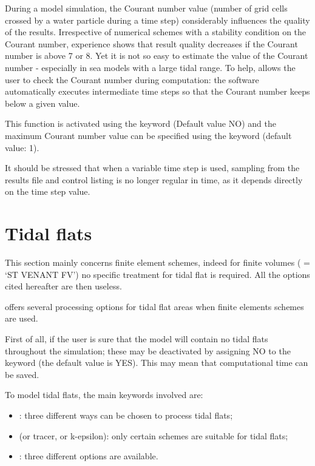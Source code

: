  During a model simulation, the Courant number value (number of grid cells crossed by a water particle during a time step) considerably influences the quality of the results. Irrespective of numerical schemes with a stability condition on the Courant number, experience shows that result quality decreases if the Courant number is above 7 or 8. Yet it is not so easy to estimate the value of the Courant number - especially in sea models with a large tidal range. To help,  allows the user to check the Courant number during computation: the software automatically executes intermediate time steps so that the Courant number keeps below a given value.

 This function is activated using the keyword  (Default value NO) and the maximum Courant number value can be specified using the keyword  (default value: 1).

 It should be stressed that when a variable time step is used, sampling from the results file and control listing is no longer regular in time, as it depends directly on the time step value.


\section{ Tidal flats}
This section mainly concerns finite element schemes, indeed for finite volumes ( = `ST VENANT FV') no specific treatment for tidal flat is required.
All the options cited hereafter are then useless.

 offers several processing options for tidal flat areas when finite elements schemes are used.

 First of all, if the user is sure that the model will contain no tidal flats throughout the simulation; these may be deactivated by assigning NO to the keyword  (the default value is YES). This may mean that computational time can be saved.

To model tidal flats, the main keywords involved are:
\begin{itemize}
\item {}: three different ways can be chosen to process tidal flats;
\item {} (or tracer, or k-epsilon): only certain schemes are suitable for tidal flats;
\item {}: three different options are available.
\end{itemize}

